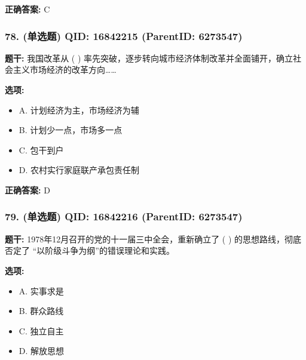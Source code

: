 \documentclass[12pt,UTF8]{ctexart}
\begin{document}
\textbf{正确答案:}
C

\vspace{0.3em}\hrulefill\vspace{0.7em}

\subsubsection*{78. (单选题) \small QID: 16842215 (ParentID: 6273547)}

\textbf{题干:}
我国改革从 ( ) 率先突破，逐步转向城市经济体制改革并全面铺开，确立社会主义市场经济的改革方向……



\textbf{选项:}
\begin{itemize}[leftmargin=*]

  \item A. 计划经济为主，市场经济为辅

  \item B. 计划少一点，市场多一点

  \item C. 包干到户

  \item D. 农村实行家庭联产承包责任制

\end{itemize}

\textbf{正确答案:}
D

\vspace{0.3em}\hrulefill\vspace{0.7em}

\subsubsection*{79. (单选题) \small QID: 16842216 (ParentID: 6273547)}

\textbf{题干:}
1978年12月召开的党的十一届三中全会，重新确立了 ( ) 的思想路线，彻底否定了 “以阶级斗争为纲”的错误理论和实践。



\textbf{选项:}
\begin{itemize}[leftmargin=*]

  \item A. 实事求是

  \item B. 群众路线

  \item C. 独立自主

  \item D. 解放思想

\end{itemize}
\end{document}
